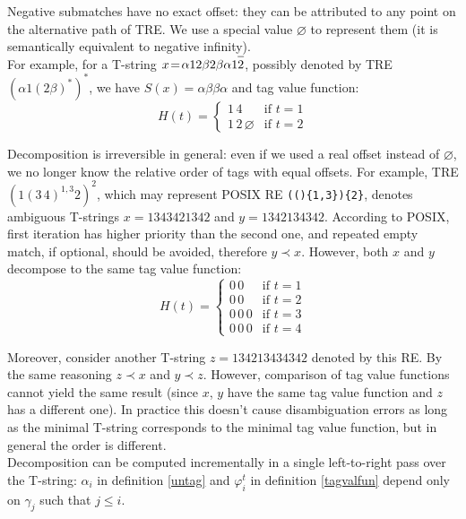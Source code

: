 \documentclass{article}
\newcommand{\Xeq}{\!=\!}
\newcommand*{\Xbar}[1]{\overline{#1\vphantom{\bar{#1}}}}
\theoremstyle{definition}
\begin{document}
\begin{multicols}{2}
Negative submatches have no exact offset: they can be attributed to any point on the alternative path of TRE.
We use a special value $\varnothing$ to represent them
(it is semantically equivalent to negative infinity).
\\

For example, for a T-string $x \Xeq \alpha 1 2 \beta 2 \beta \alpha 1 \Xbar{2}$,
possibly denoted by TRE $(\alpha 1 (2 \beta)^*)^*$, we have
$S(x) \Xeq \alpha \beta \beta \alpha$ and tag value function:
    $$H(t) \Xeq \begin{cases}
        1 \, 4 &\text{if } t \Xeq 1 \\[-0.5em]
        1 \, 2 \, \varnothing &\text{if } t \Xeq 2
    \end{cases}$$

Decomposition is irreversible in general:
even if we used a real offset instead of $\varnothing$, we no longer know the relative order of tags with equal offsets.
For example, TRE $(1 (3 \, 4)^{1,3} 2)^{2}$,
which may represent POSIX RE \texttt{(()\{1,3\})\{2\}},
denotes ambiguous T-strings $x \Xeq 1 3 4 3 4 2 1 3 4 2$ and $y \Xeq 1 3 4 2 1 3 4 3 4 2$.
According to POSIX, first iteration has higher priority than the second one,
and repeated empty match, if optional, should be avoided, therefore $y \prec x$.
However, both $x$ and $y$ decompose to the same tag value function:
    $$H(t) \Xeq \begin{cases}
        0 \, 0 &\text{if } t \Xeq 1 \\[-0.5em]
        0 \, 0 &\text{if } t \Xeq 2 \\[-0.5em]
        0 \, 0 \, 0 &\text{if } t \Xeq 3\\[-0.5em]
        0 \, 0 \, 0 &\text{if } t \Xeq 4
    \end{cases}$$

Moreover, consider another T-string $z \Xeq 1 3 4 2 1 3 4 3 4 3 4 2$ denoted by this RE.
By the same reasoning $z \prec x$ and $y \prec z$.
However, comparison of tag value functions cannot yield the same result
(since $x$, $y$ have the same tag value function and $z$ has a different one).
In practice this doesn't cause disambiguation errors
as long as the minimal T-string corresponds to the minimal tag value function,
but in general the order is different.
\\

Decomposition can be computed incrementally in a single left-to-right pass over the T-string:
$\alpha_i$ in definition \ref{untag} and
$\varphi_i^t$ in definition \ref{tagvalfun} depend only on $\gamma_j$ such that $j \!\leq\! i$.


\end{multicols}
\end{document}
